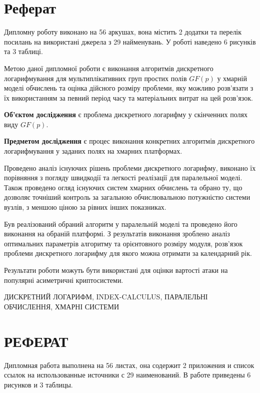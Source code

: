 \setcounter{page}{4}
\chapter*{Реферат}
\pagestyle{plain}

Дипломну роботу виконано на 56 аркушах, вона містить 2 додатки та перелік посилань на використані джерела з 29 найменувань. У роботі наведено 6 рисунків та 3 таблиці.

Метою даної дипломної роботи є виконання алгоритмів дискретного логарифмування для мультиплікативних груп простих полів $GF(p)$ у хмарній моделі обчислень та оцінка дійсного розміру проблеми, яку можливо розв'язати з їх використанням за певний період часу та матеріальних витрат на цей розв'язок.

\textbf{Об'єктом дослідження} є проблема дискретного логарифму у скінченних полях виду $GF(p)$.

\textbf{Предметом дослідження} є процес виконання конкретних алгоритмів дискретного логарифмування у заданих полях на хмарних платформах.

Проведено аналіз існуючих рішень проблеми дискретного логарифму, виконано їх порівняння з погляду швидкодії та легкості реалізації для паралельної моделі. Також проведено огляд існуючих систем хмарних обчислень та обрано ту, що дозволяє точніший контроль за загальною обчислювальною потужністю системи вузлів, з меншою ціною за рівних інших показниках. 

Був реалізований обраний алгоритм у паралельній моделі та проведено його виконання на обраній платформі. З результатів виконання зроблено аналіз оптимальних параметрів алгоритму та орієнтовного розміру модуля, розв'язок проблеми дискретного логарифму для якого можна отримати за календарний рік.


Результати роботи можуть бути використані для оцінки вартості атаки на популярні асиметричні криптосистеми.

\MakeUppercase{дискретний логарифм, index-calculus, паралельні обчислення, хмарні системи}

\chapter*{РЕФЕРАТ}
\pagestyle{plain}
Дипломная работа выполнена на 56 листах, она содержит 2 приложения и список ссылок на использованные источники с 29 наименований. В работе приведены 6 рисунков и 3 таблицы.

